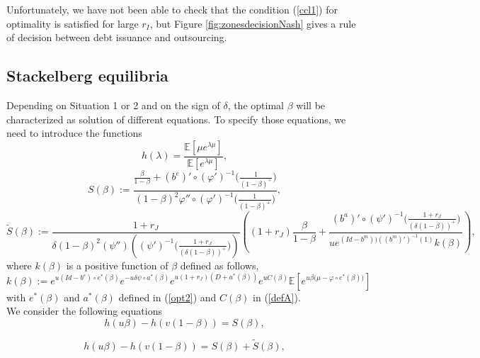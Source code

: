 \documentclass{svjour3}
\begin{document}
 Unfortunately, we have not been able to check that the
   condition (\ref{ccl1}) for optimality is satisfied for large $r_I$,
	but Figure \ref{fig:zonesdecisionNash} gives a rule
	of decision between debt issuance and outsourcing.

\subsection{Stackelberg equilibria}
\label{sec:stack}
Depending on Situation 1 or 2 and on the sign of $\delta$, the optimal $\beta$ will be characterized as solution of different equations. To specify those equations, we need to introduce the functions 
\begin{equation}
\label{def:h}
h(\lambda)=\frac{\mathbb{E}\left[\mu e^{\lambda\mu}\right]}{\mathbb{E}\left[e^{\lambda\mu}\right]},
\end{equation}
\begin{equation}\label{def:S}
S(\beta):=\frac{\frac{\beta}{1-\beta}+(b^e)'\circ(\varphi')^{-1}\Big(\frac{1}{(1-\beta)^+}\Big)}{(1-\beta)^2\varphi''\circ(\varphi')^{-1}\Big(\frac{1}{(1-\beta)^+}\Big)}, 
 \end{equation}
{\small 
\begin{equation}
\label{def:Stilde}
\widetilde{S}(\beta):=
\frac{1+r_J}{\delta(1-\beta)^2 (\psi'')((\psi')^{-1}\Big(\frac{1+r_J}{(\delta(1-\beta))^+}\Big)) } \left(  (1+r_J)\frac{\beta}{1-\beta} +  \frac{(b^a)'\circ(\psi')^{-1}\Big(\frac{1+r_J}{(\delta(1-\beta))^+}\Big)}{ u  e^{ (Id-b^m) ) ((b^m)')^{-1}(1)} k(\beta)  }      \right),
\end{equation}}
where $k(\beta)$ is a positive function of $\beta$ defined  as follows,
{\small 
\begin{equation}
\label{defk}
k(\beta):=e^{u(Id-b^e)\circ e^*(\beta)}   e^{-u \delta \psi \circ a^*(\beta)}e^{u(1+r_J)(D+a^*(\beta))}   e^{uC(\beta)}\mathbb{E}\left[e^{u\beta\big(\mu-\varphi\circ e^*(\beta)\big)}\right]
\end{equation}}
with $e^*(\beta)$ and $a^*(\beta)$ defined in (\ref{opt2}) and $C(\beta)$ in (\ref{defA}).\\

We consider the  following equations
\begin{equation}
\label{eqbetaStackelberg}
h(u\beta)-h(v(1-\beta))={S} (\beta),
\end{equation}

\begin{equation}
\label{eqbetaStackelbergpb1positif}
h(u\beta)-h(v(1-\beta))=S(\beta)+\widetilde{S} (\beta),
\end{equation}
\end{document}
